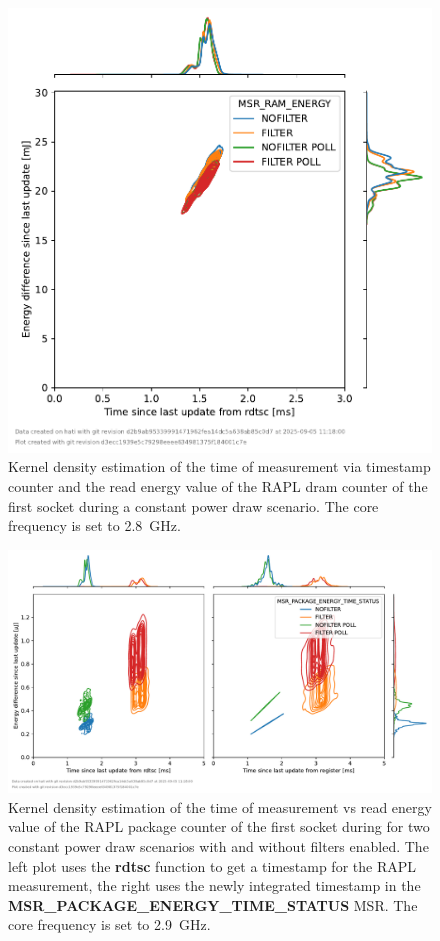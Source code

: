 \begin{figure}[]
    \centering
    \includegraphics[width=0.54\columnwidth]{fig/rapl-update-intervals/MSR_RAM_ENERGY_2800000.pdf}
    \caption{Kernel density estimation of the time of measurement via timestamp counter and the read energy value of the RAPL dram counter of the first socket during a constant power draw scenario.
    The core frequency is set to \SI{2.8}{\GHz}.}
\end{figure}

\clearpage
\begin{figure}[]
    \centering
    \includegraphics[width=\columnwidth]{fig/rapl-update-intervals/MSR_PACKAGE_ENERGY_TIME_STATUS_2900000.pdf}
    \caption{Kernel density estimation of the time of measurement vs read energy value of the RAPL package counter of the first socket during for two constant power draw scenarios with and without filters enabled.
    The left plot uses the \textbf{rdtsc} function to get a timestamp for the RAPL measurement, the right uses the newly integrated timestamp in the \textbf{MSR\_PACKAGE\_ENERGY\_TIME\_STATUS} MSR.
    The core frequency is set to \SI{2.9}{\GHz}.}
\end{figure}

